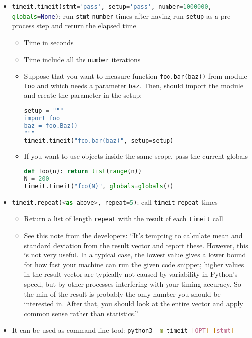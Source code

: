 \documentclass[a4paper,12pt,%
              final%
              ]{article}
\begin{document}
\begin{itemize}
    \begin{itemize}
      \item \lstinline[language=python]{timeit.timeit(stmt='pass', setup='pass', number=1000000, globals=None)}: run \texttt{stmt} \texttt{number} times after having run \texttt{setup} as a pre-process step and return the elapsed time
        \begin{itemize}
          \item Time in seconds
          \item Time include all the \texttt{number} iterations
          \item Suppose that you want to measure function \lstinline[language=python]{foo.bar(baz))} from module \texttt{foo} and which needs a parameter \texttt{baz}. Then, should import the module and create the parameter in the setup:
\begin{lstlisting}[language=python]
setup = """
import foo
baz = foo.Baz()
"""
timeit.timeit("foo.bar(baz)", setup=setup)
\end{lstlisting}
          \item If you want to use objects inside the same scope, pass the current globals
\begin{lstlisting}[language=python]
def foo(n): return list(range(n))
N = 200
timeit.timeit("foo(N)", globals=globals())
\end{lstlisting}
        \end{itemize}
      \item \lstinline[language=python]{timeit.repeat(<as above>, repeat=5)}: call \texttt{timeit} \texttt{repeat} times
        \begin{itemize}
          \item Return a list of length \texttt{repeat} with the result of each \texttt{timeit} call
          \item See this note from the developers: ``It’s tempting to calculate mean and standard deviation from the result vector and report these. However, this is not very useful. In a typical case, the lowest value gives a lower bound for how fast your machine can run the given code snippet; higher values in the result vector are typically not caused by variability in Python’s speed, but by other processes interfering with your timing accuracy. So the min of the result is probably the only number you should be interested in. After that, you should look at the entire vector and apply common sense rather than statistics.''
        \end{itemize}
      \item It can be used as command-line tool: \lstinline[language=bash]{python3 -m timeit [OPT] [stmt]}

\end{itemize}
\end{itemize}
\end{document}
